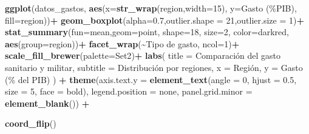 \documentclass[notspecified,article,submit,moreauthors,pdftex]{Definitions/mdpi}
\newenvironment{Shaded}{\begin{snugshade}}{\end{snugshade}}
\newcommand{\AttributeTok}[1]{\textcolor[rgb]{0.13,0.29,0.53}{#1}}
\newcommand{\DecValTok}[1]{\textcolor[rgb]{0.00,0.00,0.81}{#1}}
\newcommand{\FloatTok}[1]{\textcolor[rgb]{0.00,0.00,0.81}{#1}}
\newcommand{\FunctionTok}[1]{\textcolor[rgb]{0.13,0.29,0.53}{\textbf{#1}}}
\newcommand{\NormalTok}[1]{#1}
\newcommand{\SpecialCharTok}[1]{\textcolor[rgb]{0.81,0.36,0.00}{\textbf{#1}}}
\newcommand{\StringTok}[1]{\textcolor[rgb]{0.31,0.60,0.02}{#1}}
\begin{document}
\begin{Shaded}
\begin{Highlighting}[]
\FunctionTok{ggplot}\NormalTok{(datos\_gastos, }\FunctionTok{aes}\NormalTok{(}\AttributeTok{x=}\FunctionTok{str\_wrap}\NormalTok{(region,}\AttributeTok{width=}\DecValTok{15}\NormalTok{), }\AttributeTok{y=}\StringTok{\textasciigrave{}}\AttributeTok{Gasto (\%PIB)}\StringTok{\textasciigrave{}}\NormalTok{, }\AttributeTok{fill=}\NormalTok{region))}\SpecialCharTok{+}
  \FunctionTok{geom\_boxplot}\NormalTok{(}\AttributeTok{alpha=}\FloatTok{0.7}\NormalTok{,}\AttributeTok{outlier.shape =} \DecValTok{21}\NormalTok{,}\AttributeTok{outlier.size =} \DecValTok{1}\NormalTok{)}\SpecialCharTok{+}
  \FunctionTok{stat\_summary}\NormalTok{(}\AttributeTok{fun=}\NormalTok{mean,}\AttributeTok{geom=}\StringTok{\textquotesingle{}point\textquotesingle{}}\NormalTok{, }\AttributeTok{shape=}\DecValTok{18}\NormalTok{, }\AttributeTok{size=}\DecValTok{2}\NormalTok{, }\AttributeTok{color=}\StringTok{\textquotesingle{}darkred\textquotesingle{}}\NormalTok{, }\FunctionTok{aes}\NormalTok{(}\AttributeTok{group=}\NormalTok{region))}\SpecialCharTok{+}
  \FunctionTok{facet\_wrap}\NormalTok{(}\SpecialCharTok{\textasciitilde{}}\StringTok{\textasciigrave{}}\AttributeTok{Tipo de gasto}\StringTok{\textasciigrave{}}\NormalTok{, }\AttributeTok{ncol=}\DecValTok{1}\NormalTok{)}\SpecialCharTok{+}
  \FunctionTok{scale\_fill\_brewer}\NormalTok{(}\AttributeTok{palette=}\StringTok{\textquotesingle{}Set2\textquotesingle{}}\NormalTok{)}\SpecialCharTok{+}
  \FunctionTok{labs}\NormalTok{(}
    \AttributeTok{title =} \StringTok{\textquotesingle{}Comparación del gasto sanitario y militar\textquotesingle{}}\NormalTok{,}
    \AttributeTok{subtitle =} \StringTok{\textquotesingle{}Distribución por regiones\textquotesingle{}}\NormalTok{,}
    \AttributeTok{x =} \StringTok{\textquotesingle{}Región\textquotesingle{}}\NormalTok{,}
    \AttributeTok{y =} \StringTok{\textquotesingle{}Gasto (\% del PIB)\textquotesingle{}}
\NormalTok{  ) }\SpecialCharTok{+}
  \FunctionTok{theme}\NormalTok{(}\AttributeTok{axis.text.y =} \FunctionTok{element\_text}\NormalTok{(}\AttributeTok{angle =} \DecValTok{0}\NormalTok{, }\AttributeTok{hjust =} \FloatTok{0.5}\NormalTok{, }\AttributeTok{size =} \DecValTok{5}\NormalTok{, }\AttributeTok{face =} \StringTok{\textquotesingle{}bold\textquotesingle{}}\NormalTok{),}
        \AttributeTok{legend.position =} \StringTok{\textquotesingle{}none\textquotesingle{}}\NormalTok{, }
        \AttributeTok{panel.grid.minor =} \FunctionTok{element\_blank}\NormalTok{()) }\SpecialCharTok{+}
  
  \FunctionTok{coord\_flip}\NormalTok{()}
\end{Highlighting}
\end{Shaded}
\end{document}
